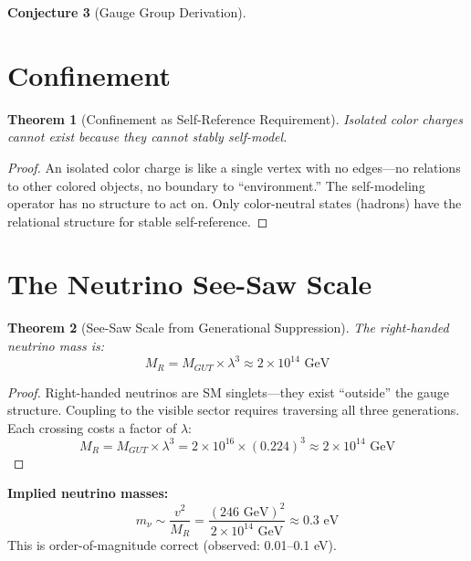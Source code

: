 \documentclass[11pt,a4paper]{article}
\theoremstyle{plain}
\newtheorem{theorem}{Theorem}[section]
\theoremstyle{definition}
\newtheorem{conjecture}[theorem]{Conjecture}
\theoremstyle{remark}
\begin{document}
\begin{conjecture}[Gauge Group Derivation]
\section{Confinement}

\begin{theorem}[Confinement as Self-Reference Requirement]
Isolated color charges cannot exist because they cannot stably self-model.
\end{theorem}

\begin{proof}
An isolated color charge is like a single vertex with no edges---no relations to other colored objects, no boundary to ``environment.'' The self-modeling operator has no structure to act on. Only color-neutral states (hadrons) have the relational structure for stable self-reference.
\end{proof}

\section{The Neutrino See-Saw Scale}

\begin{theorem}[See-Saw Scale from Generational Suppression]
The right-handed neutrino mass is:
\begin{equation}
\boxed{M_R = M_{GUT} \times \lambda^3 \approx 2 \times 10^{14} \text{ GeV}}
\end{equation}
\end{theorem}

\begin{proof}
Right-handed neutrinos are SM singlets---they exist ``outside'' the gauge structure. Coupling to the visible sector requires traversing all three generations. Each crossing costs a factor of $\lambda$:
\begin{equation}
M_R = M_{GUT} \times \lambda^3 = 2 \times 10^{16} \times (0.224)^3 \approx 2 \times 10^{14} \text{ GeV}
\end{equation}
\end{proof}

\textbf{Implied neutrino masses:}
\begin{equation}
m_\nu \sim \frac{v^2}{M_R} = \frac{(246 \text{ GeV})^2}{2 \times 10^{14} \text{ GeV}} \approx 0.3 \text{ eV}
\end{equation}
This is order-of-magnitude correct (observed: 0.01--0.1 eV).


\end{conjecture}
\end{document}
